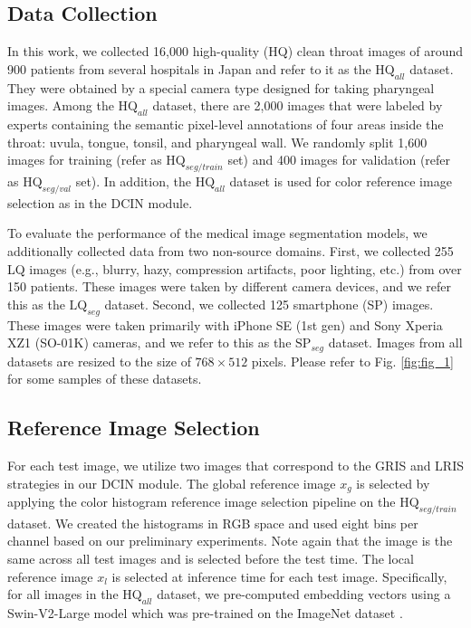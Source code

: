 \subsection{Data Collection}
In this work, we collected 16,000 high-quality (HQ) clean throat images of around 900 patients from several hospitals in Japan and refer to it as the $\mathrm{HQ}_{all}$ dataset. 
They were obtained by a special camera type designed for taking pharyngeal images. 
Among the $\mathrm{HQ}_{all}$ dataset, there are 2,000 images that were labeled by experts containing the semantic pixel-level annotations of four areas inside the throat: uvula, tongue, tonsil, and pharyngeal wall. 
We randomly split 1,600 images for training (refer as $\mathrm{HQ}_{seg/train}$ set) and 400 images for validation (refer as $\mathrm{HQ}_{seg/val}$ set). 
In addition, the $\mathrm{HQ}_{all}$ dataset is used for color reference image selection as in the DCIN module. 

To evaluate the performance of the medical image segmentation models, we additionally collected data from two non-source domains. 
First, we collected 255 LQ images (e.g., blurry, hazy, compression artifacts, poor lighting, etc.) from over 150 patients. 
These images were taken by different camera devices, and we refer this as the $\mathrm{LQ}_{seg}$ dataset. 
Second, we collected 125 smartphone (SP) images. 
These images were taken primarily with iPhone SE (1st gen) and Sony Xperia XZ1 (SO-01K) cameras, and we refer to this as the $\mathrm{SP}_{seg}$ dataset. 
Images from all datasets are resized to the size of $768 \times 512$ pixels. 
Please refer to Fig. \ref{fig:fig_1} for some samples of these datasets. 

\subsection{Reference Image Selection}
For each test image, we utilize two images that correspond to the GRIS and LRIS strategies in our DCIN module. 
The global reference image $x_g$ is selected by applying the color histogram reference image selection pipeline on the $\mathrm{HQ}_{seg/train}$ dataset. 
We created the histograms in RGB space and used eight bins per channel based on our preliminary experiments. 
Note again that the image is the same across all test images and is selected before the test time. 
The local reference image $x_l$ is selected at inference time for each test image. 
Specifically, for all images in the $\mathrm{HQ}_{all}$ dataset, we pre-computed embedding vectors using a Swin-V2-Large model \cite{liu2021swin} which was pre-trained on the ImageNet dataset \cite{deng09imagenet}. 

